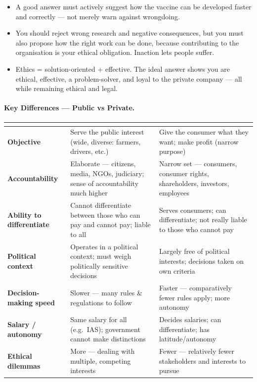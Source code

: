 \begin{CriticalPoint}
\begin{itemize}
\item A good answer must actively suggest how the vaccine can be developed faster and correctly --- not merely warn against wrongdoing.
\item You should reject wrong research and negative consequences, but you must also propose how the right work can be done, because contributing to the organisation is your ethical obligation. Inaction lets people suffer.
\item Ethics = solution-oriented + effective. The ideal answer shows you are ethical, effective, a problem-solver, and loyal to the private company --- all while remaining ethical and legal.
\end{itemize}
\end{CriticalPoint}

\paragraph{Key Differences --- Public vs Private.}

\begin{tabularx}{\textwidth}{@{}>{\bfseries\color{Accent}}p{2.6cm} Y Y@{}}
\toprule
{} &  &  \\
\midrule
Objective & Serve the public interest (wide, diverse: farmers, drivers, etc.) & Give the consumer what they want; make profit (narrow purpose) \\
Accountability & Elaborate --- citizens, media, NGOs, judiciary; sense of accountability much higher & Narrow set --- consumers, consumer rights, shareholders, investors, employees \\
Ability to differentiate & Cannot differentiate between those who can pay and cannot pay; liable to all & Serves consumers; can differentiate; not really liable to those who cannot pay \\
Political context & Operates in a political context; must weigh politically sensitive decisions & Largely free of political interests; decisions taken on own criteria \\
Decision-making speed & Slower --- many rules \& regulations to follow & Faster --- comparatively fewer rules apply; more autonomy \\
Salary / autonomy & Same salary for all (e.g.\ IAS); government cannot make distinctions & Decides salaries; can differentiate; has latitude/autonomy \\
Ethical dilemmas & More --- dealing with multiple, competing interests & Fewer --- relatively fewer stakeholders and interests to pursue \\
\bottomrule
\end{tabularx}


